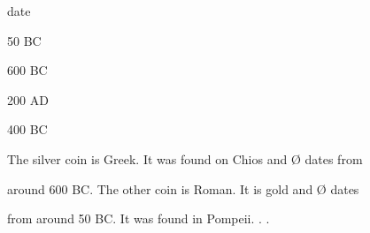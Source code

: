 \documentclass[compress,color=usenames]{beamer}
\begin{document}
\begin{frame}
date



50 BC



600 BC



200 AD



400 BC






The silver coin is Greek. It was found on Chios and {\O} dates from



around 600 BC. The other coin is Roman. It is gold and {\O} dates



from around 50 BC. It was found in Pompeii. . .










\end{frame}
\end{document}
